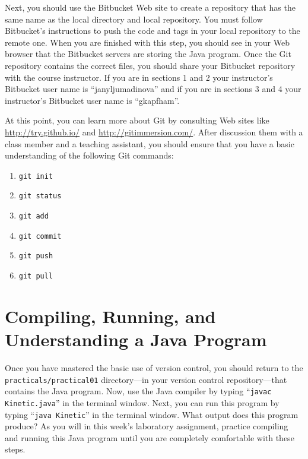 Next, you should use the Bitbucket Web site to create a repository that has the same name as the local directory and
local repository.  You must follow Bitbucket's instructions to push the code and tags in your local repository to the
remote one. When you are finished with this step, you should see in your Web browser that the Bitbucket servers are
storing the Java program. Once the Git repository contains the correct files, you should share your Bitbucket repository
with the course instructor. If you are in sections 1 and 2 your instructor's Bitbucket user name is ``janyljumadinova'' and if you are in sections 3 and 4 your instructor's Bitbucket user name is ``gkapfham''.

At this point, you can learn more about Git by consulting Web sites like \url{http://try.github.io/} and
\url{http://gitimmersion.com/}.  After discussion them with a class member and a teaching assistant, you should ensure
that you have a basic understanding of the following Git commands:

\vspace*{-.125in}
\begin{enumerate} 
  \item {\tt git init}
  \item {\tt git status}
  \item {\tt git add} 
  \item {\tt git commit}
  \item {\tt git push}
  \item {\tt git pull} 
\end{enumerate}
\vspace*{-.125in}

\section*{Compiling, Running, and Understanding a Java Program}

Once you have mastered the basic use of version control, you should return to the \\ {\tt practicals/practical01}
directory---in your version control repository---that contains the Java program. Now, use the Java compiler by typing
``{\tt javac Kinetic.java}'' in the terminal window.  Next, you can run this program by typing ``{\tt java Kinetic}'' in
the terminal window.  What output does this program produce?  As you will in this week's laboratory assignment, practice
compiling and running this Java program until you are completely comfortable with these steps.

